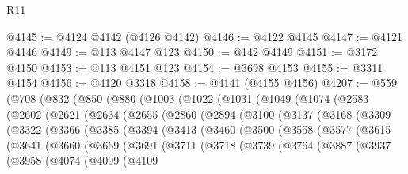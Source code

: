 \begin{lexlean}{R11}
\begin{coremodule}
@4145 := @4124 @4142 (@4126 @4142)
@4146 := @4122 @4145
@4147 := @4121 @4146
@4149 := @113 @4147 @123
@4150 := @142 @4149
@4151 := @3172 @4150
@4153 := @113 @4151 @123
@4154 := @3698 @4153
@4155 := @3311 @4154
@4156 := @4120 @3318
@4158 := @4141 (@4155 @4156)
@4207 := @559
    (@708
      (@832
        (@850
          (@880
            (@1003
              (@1022
                (@1031
                  (@1049
                    (@1074
                      (@2583
                        (@2602
                          (@2621
                            (@2634
                              (@2655
                                (@2860
                                  (@2894
                                    (@3100
                                      (@3137
                                        (@3168
                                          (@3309
                                            (@3322
                                              (@3366
                                                (@3385
                                                  (@3394
                                                    (@3413
                                                      (@3460
                                                        (@3500
                                                          (@3558
                                                            (@3577
                                                              (@3615
                                                                (@3641
                                                                  (@3660
                                                                    (@3669
                                                                      (@3691
                                                                        (@3711
                                                                          (@3718
                                                                            (@3739
                                                                              (@3764
                                                                                (@3887
                                                                                  (@3937
                                                                                    (@3958
                                                                                      (@4074
                                                                                        (@4099
                                                                                          (@4109

\end{coremodule}
\end{lexlean}
